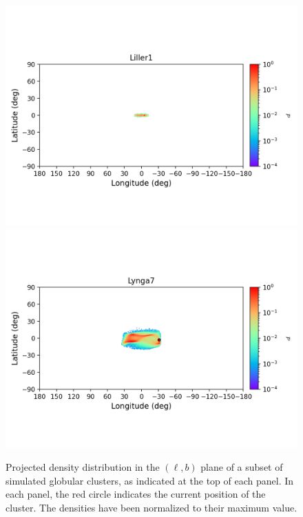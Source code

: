 \begin{figure}
\begin{center}
                \includegraphics[clip=true, trim = 0mm 20mm 0mm 10mm, width=1\columnwidth]{images/error_plots_Liller1.png}
                \includegraphics[clip=true, trim = 0mm 20mm 0mm 10mm, width=1\columnwidth]{images/error_plots_Lynga7.png}
            \end{center}
            \caption[]{Projected density distribution in the $(\ell, b)$ plane of a subset of simulated globular clusters, as indicated at the top of each panel. In each panel, the red circle indicates the current position of the cluster. The densities have been normalized to their maximum value.}\label{stream3}
        \end{figure}
        
